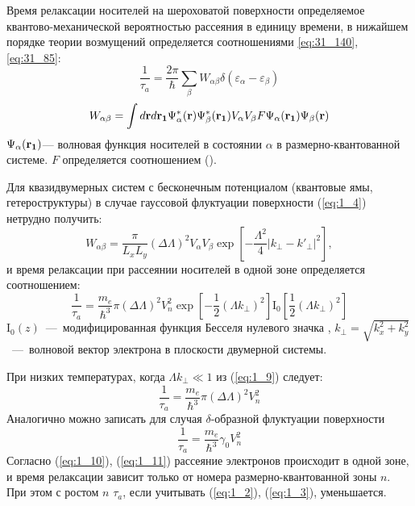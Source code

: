 Время релаксации носителей на шероховатой поверхности определяемое квантово-механической вероятностью рассеяния в единицу времени, в нижайшем порядке теории возмущений определяется соотношениями \eqref{eq:31_140}, \eqref{eq:31_85}:
\begin{equation} \label{eq:1_8}
\frac{1}{\tau_a}=\frac{2\pi}{\hbar} \sum_\beta{W_{\alpha\beta}\delta\left(\varepsilon_\alpha-\varepsilon_\beta\right)}
\end{equation}
\begin{equation} \label{eq:1_8_5}
W_{\alpha\beta}=\int{d\boldsymbol{\mathbf{r}} d\boldsymbol{\mathbf{r_1}} \Psi^*_\alpha(\boldsymbol{\mathbf{r}}) \Psi^*_\beta(\boldsymbol{\mathbf{r_1}}) V_\alpha V_\beta F \Psi_\alpha(\boldsymbol{\mathbf{r_1}}) \Psi_\beta(\boldsymbol{\mathbf{r}})}
\end{equation}
$\Psi_\alpha(\boldsymbol{\mathbf{r_1}})$--- волновая функция носителей в состоянии $\alpha$ в размерно-квантованной системе. $F$ определяется соотношением ().

Для квазидвумерных систем с бесконечным потенциалом (квантовые ямы, гетероструктуры) в случае гауссовой флуктуации поверхности (\ref{eq:1_4}) нетрудно получить:
\begin{equation} \label{eq:1_9_0}
W_{\alpha\beta} =\frac{\pi }{L_x L_y} (\Delta \Lambda )^2 V_{\alpha} V_{\beta } \exp \left[-\frac{\Lambda^2 }{4} \left|k_{\bot } -k'_{\bot } \right|^2 \right],
\end{equation}
и время релаксации при рассеянии носителей в одной зоне определяется соотношением:
\begin{equation} \label{eq:1_9}
\frac{1}{\tau_a}=\frac{m_e}{\hbar^3}\pi{(\Delta \Lambda)}^2 V_n^2 \exp{\left[-\frac{1}{2}(\Lambda k_\bot )^2\right]} \mathrm{I}_0 \left[\frac{1}{2}(\Lambda k_\bot)^2\right]
\end{equation}
$\mathrm{I}_0(z)$~---~модифицированная функция Бесселя нулевого значка \cite{Abramowitz1979}, $k_\bot = \sqrt{k^2_x+k^2_y}$~---~волновой вектор электрона в плоскости двумерной системы.

При низких температурах, когда $\Lambda k_\bot \ll 1$ из (\ref{eq:1_9}) следует:
\begin{equation} \label{eq:1_10}
\frac{1}{\tau_a}=\frac{m_e }{\hbar^3}\pi (\Delta \Lambda)^2 V_n^2
\end{equation}
Аналогично можно записать для случая $\delta$-образной флуктуации поверхности
\begin{equation} \label{eq:1_11}
\frac{1}{\tau_a}=\frac{m_e}{\hbar^3}\gamma_0 V_n^2
\end{equation}
Согласно (\ref{eq:1_10}), (\ref{eq:1_11}) рассеяние электронов происходит в одной зоне, и время релаксации зависит только от номера размерно-квантованной зоны $n$. При этом с ростом $n$ $\tau_a$, если учитывать (\ref{eq:1_2}), (\ref{eq:1_3}), уменьшается.

